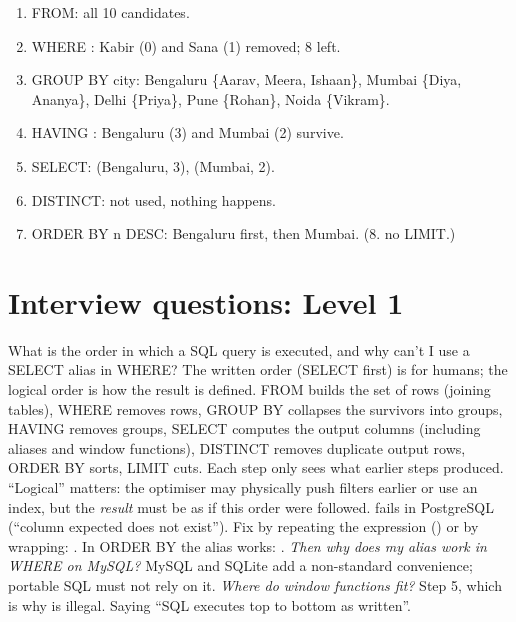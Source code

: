 \begin{example}
\begin{enumerate}
\item FROM: all 10 candidates.
\item WHERE : Kabir (0) and Sana (1) removed; 8 left.
\item GROUP BY city: Bengaluru \{Aarav, Meera, Ishaan\}, Mumbai \{Diya, Ananya\}, Delhi \{Priya\}, Pune \{Rohan\}, Noida \{Vikram\}.
\item HAVING : Bengaluru (3) and Mumbai (2) survive.
\item SELECT: (Bengaluru, 3), (Mumbai, 2).
\item DISTINCT: not used, nothing happens.
\item ORDER BY n DESC: Bengaluru first, then Mumbai. (8. no LIMIT.)
\end{enumerate}
\end{example}

\section{Interview questions: Level 1}

\begin{qa}{\classic What is the order in which a SQL query is executed, and why can't I use a SELECT alias in WHERE?}
\why The written order (SELECT first) is for humans; the logical order is how the result is defined. FROM builds the set of rows (joining tables), WHERE
removes rows, GROUP BY collapses the survivors into groups, HAVING removes groups, SELECT computes the output columns (including aliases and window
functions), DISTINCT removes duplicate output rows, ORDER BY sorts, LIMIT cuts. Each step only sees what earlier steps produced. ``Logical'' matters:
the optimiser may physically push filters earlier or use an index, but the \emph{result} must be as if this order were followed.
\worked {} fails in PostgreSQL (``column expected does not exist''). Fix by
repeating the expression () or by wrapping: . In ORDER BY the alias works: .
\pushes \emph{Then why does my alias work in WHERE on MySQL?} MySQL and SQLite add a non-standard convenience; portable SQL must not rely on it.
\emph{Where do window functions fit?} Step 5, which is why  is illegal.
\pitfall Saying ``SQL executes top to bottom as written''.
\end{qa}

